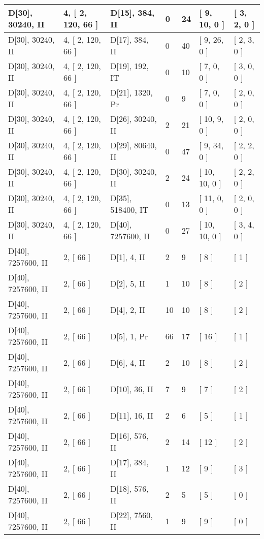 \documentclass[9 pt]{scrartcl}
\begin{document}
\begin{longtable}{ |p{3em}|p{6em}|p{3em}|p{2em}|p{2em}|p{6em}|p{6em}| }
D[30], 30240, II &4, [ 2, 120, 66 ] & D[15], 384, II  & 0 & 24 & [ 9, 10, 0 ] & [ 3, 2, 0 ]\\ \hline
D[30], 30240, II &4, [ 2, 120, 66 ] & D[17], 384, II  & 0 & 40 & [ 9, 26, 0 ] & [ 2, 3, 0 ]\\ \hline
D[30], 30240, II &4, [ 2, 120, 66 ] & D[19], 192, IT  & 0 & 10 & [ 7, 0, 0 ] & [ 3, 0, 0 ]\\ \hline
D[30], 30240, II &4, [ 2, 120, 66 ] & D[21], 1320, Pr  & 0 & 9 & [ 7, 0, 0 ] & [ 2, 0, 0 ]\\ \hline
D[30], 30240, II &4, [ 2, 120, 66 ] & D[26], 30240, II  & 2 & 21 & [ 10, 9, 0 ] & [ 2, 0, 0 ]\\ \hline
D[30], 30240, II &4, [ 2, 120, 66 ] & D[29], 80640, II  & 0 & 47 & [ 9, 34, 0 ] & [ 2, 2, 0 ]\\ \hline
D[30], 30240, II &4, [ 2, 120, 66 ] & D[30], 30240, II  & 2 & 24 & [ 10, 10, 0 ] & [ 2, 2, 0 ]\\ \hline
D[30], 30240, II &4, [ 2, 120, 66 ] & D[35], 518400, IT  & 0 & 13 & [ 11, 0, 0 ] & [ 2, 0, 0 ]\\ \hline
D[30], 30240, II &4, [ 2, 120, 66 ] & D[40], 7257600, II  & 0 & 27 & [ 10, 10, 0 ] & [ 3, 4, 0 ]\\ \hline
D[40], 7257600, II &2, [ 66 ] & D[1], 4, II  & 2 & 9 & [ 8 ] & [ 1 ]\\ \hline
D[40], 7257600, II &2, [ 66 ] & D[2], 5, II  & 1 & 10 & [ 8 ] & [ 2 ]\\ \hline
D[40], 7257600, II &2, [ 66 ] & D[4], 2, II  & 10 & 10 & [ 8 ] & [ 2 ]\\ \hline
D[40], 7257600, II &2, [ 66 ] & D[5], 1, Pr  & 66 & 17 & [ 16 ] & [ 1 ]\\ \hline
D[40], 7257600, II &2, [ 66 ] & D[6], 4, II  & 2 & 10 & [ 8 ] & [ 2 ]\\ \hline
D[40], 7257600, II &2, [ 66 ] & D[10], 36, II  & 7 & 9 & [ 7 ] & [ 2 ]\\ \hline
D[40], 7257600, II &2, [ 66 ] & D[11], 16, II  & 2 & 6 & [ 5 ] & [ 1 ]\\ \hline
D[40], 7257600, II &2, [ 66 ] & D[16], 576, II  & 2 & 14 & [ 12 ] & [ 2 ]\\ \hline
D[40], 7257600, II &2, [ 66 ] & D[17], 384, II  & 1 & 12 & [ 9 ] & [ 3 ]\\ \hline
D[40], 7257600, II &2, [ 66 ] & D[18], 576, II  & 2 & 5 & [ 5 ] & [ 0 ]\\ \hline
D[40], 7257600, II &2, [ 66 ] & D[22], 7560, II  & 1 & 9 & [ 9 ] & [ 0 ]\\ \hline

\end{longtable}
\end{document}
